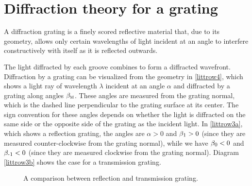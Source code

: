     \section{Diffraction theory for a grating}\label{gratingtheory}
A diffraction grating is a finely scored reflective material that, due to its geometry, allows only certain wavelengths of light incident at an angle to interfere constructively with itself as it is reflected outwards.


 The light diffracted by each groove combines to form a diffracted wavefront. Diffraction by a grating can be visualized from the geometry in \cref{littrow4}, which shows a light ray of wavelength $\lambda$ incident at an angle $\alpha$ and diffracted by a grating along angles $\beta_{\mbox{\footnotesize{\scshape{m}}}}$. These angles are measured from the grating normal, which is the dashed line perpendicular to the grating surface at its center. The sign convention for these angles depends on whether the light is diffracted on the same side or the opposite side of the grating as the incident light. In \cref{littrow3a}, which shows a reflection grating, the angles are  $\alpha>0$ and $\beta_{\mbox{\footnotesize{\scshape{1}}}}>0$ (since they are measured counter-clockwise from the grating normal), while we have $\beta_{\mbox{\footnotesize{\scshape{0}}}}<0$ and $\beta_{\mbox{\footnotesize{\scshape{-1}}}}<0$ (since they are measured clockwise from the grating normal). Diagram \cref{littrow3b} shows the case for a transmission grating.
\begin{figure}[!bht]\centering
{}
\hfill
{}
\caption{A comparison between reflection and transmission grating.}
\end{figure}

